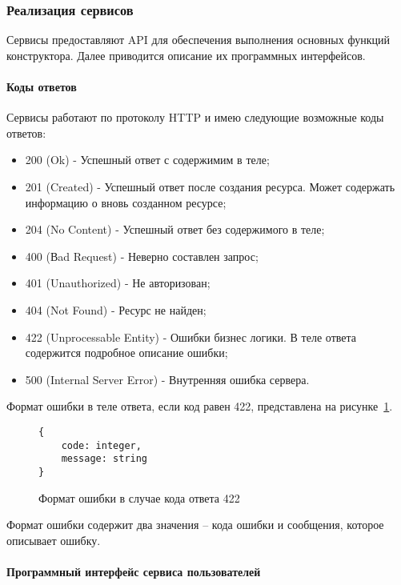 \subsubsection{Реализация сервисов}

Сервисы предоставляют API для обеспечения выполнения основных функций конструктора.
Далее приводится описание их программных интерфейсов.

\paragraph{Коды ответов}

Сервисы работают по протоколу HTTP и имею следующие возможные
коды ответов:
\begin{itemize}
	\item 200 (Ok) - Успешный ответ с содержимим в теле;
	\item 201 (Created) - Успешный ответ после создания ресурса. Может
	      содержать информацию о вновь созданном ресурсе;
	\item 204 (No Content) - Успешный ответ без содержимого в теле;
	\item 400 (Вad Request) - Неверно составлен запрос;
	\item 401 (Unauthorized) - Не авторизован;
	\item 404 (Not Found) - Ресурс не найден;
	\item 422 (Unprocessable Entity) - Ошибки бизнес логики. В теле ответа
	      содержится подробное описание ошибки;
	\item 500 (Internal Server Error) - Внутренняя ошибка сервера.
\end{itemize}

Формат ошибки в теле ответа, если код равен 422, представлена на
рисунке~\ref{f:error-struct}.


\begin{figure}[!ht]
	\centering
	\vspace{\toppaddingoffigure}
	\begin{lstlisting}
{
    code: integer,
    message: string
}
    \end{lstlisting}
	\caption{Формат ошибки в случае кода ответа 422}
	\label{f:error-struct}
\end{figure}

Формат ошибки содержит два значения – кода ошибки и сообщения,
которое описывает ошибку.

\newpage
\paragraph{Программный интерфейс сервиса пользователей}

